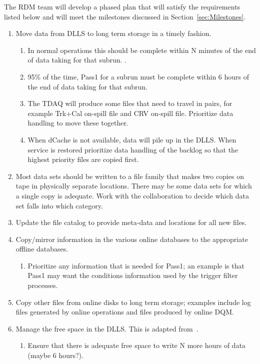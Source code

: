 The RDM team will develop a phased plan that will satisfy the requirements listed below
and will meet the milestones discussed in Section~\ref{sec:Milestones}.


\begin{enumerate}
\item Move data from DLLS to long term storage in a timely fashion.
  \begin{enumerate}
  \item In normal operations this should be complete within N minutes of the end of data taking for that subrun. .
  \item 95\% of the time, Pass1 for a subrun must be complete within 6 hours of the end of data taking for that subrun.
  \item The TDAQ will produce some files that need to travel in pairs, for example Trk+Cal on-spill file and CRV on-spill file.
    Prioritize data handling to move these together.
  \item When dCache is not available, data will pile up in the DLLS.  When service is restored prioritize data handling of the backlog
    so that the highest priority files are copied first.
  \end{enumerate}
\item Most data sets should be written to a file family that makes two copies on tape in physically separate locations.
  There may be some data sets for which a single copy is adequate.
  Work with the collaboration to decide which data set falls into which category.
\item Update the file catalog to provide meta-data and locations for all new files.
\item Copy/mirror information in the various online databases to the appropriate offline databases.
  \begin{enumerate}
  \item Prioritize any information that is needed for Pass1; an example is that Pass1 may want the conditions information
    used by the trigger filter processes.
  \end{enumerate}
\item Copy other files from online disks to long term storage; examples include log files generated by online
  operations and files produced by online DQM.
\item Manage the free space in the DLLS.  This is adapted from~\cite{OnlineMonitoring}.
  \begin{enumerate}
   \item Ensure that there is adequate free space to write N more hours of data (maybe 6 hours?).

\end{enumerate}
\end{enumerate}
